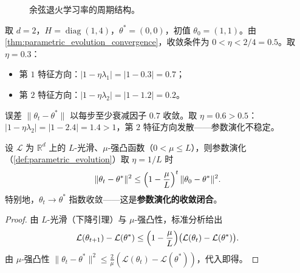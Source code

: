 \begin{figure}[htbp]
\centering
{}
\caption{余弦退火学习率的周期结构。}
\label{fig:cosine_annealing}
\end{figure}

\begin{example}[参数演化的数值验证]\label{ex:parametric_evolution_numeric}
取 $d=2$，$H = \operatorname{diag}(1,4)$，$\theta^* = (0,0)$，初值 $\theta_0 = (1,1)$。由 \cref{thm:parametric_evolution_convergence}，收敛条件为 $0 < \eta < 2/4 = 0.5$。取 $\eta = 0.3$：
\begin{itemize}
    \item 第 $1$ 特征方向：$|1-\eta\lambda_1| = |1-0.3| = 0.7$；
    \item 第 $2$ 特征方向：$|1-\eta\lambda_2| = |1-1.2| = 0.2$。
\end{itemize}
误差 $\|\theta_t - \theta^*\|$ 以每步至少衰减因子 $0.7$ 收敛。取 $\eta = 0.6 > 0.5$：$|1-\eta\lambda_2| = |1-2.4| = 1.4 > 1$，第 $2$ 特征方向发散——参数演化不稳定。
\end{example}

\begin{theorem}[参数演化的收敛闭合]\label{thm:parametric_evolution_closure}
设 $\mathcal{L}$ 为 $\mathbb{R}^d$ 上的 $L$-光滑、$\mu$-强凸函数（$0<\mu\le L$），则参数演化（\cref{def:parametric_evolution}）取 $\eta = 1/L$ 时
\[
\|\theta_t - \theta^*\|^2 \le \Bigl(1-\frac{\mu}{L}\Bigr)^t\,\|\theta_0-\theta^*\|^2.
\]
特别地，$\theta_t\to\theta^*$ 指数收敛——这是\textbf{参数演化的收敛闭合}。
\end{theorem}

\begin{proof}
由 $L$-光滑（下降引理）与 $\mu$-强凸性，标准分析给出
\[
\mathcal{L}(\theta_{t+1}) - \mathcal{L}(\theta^*) \le \Bigl(1-\frac{\mu}{L}\Bigr)\bigl(\mathcal{L}(\theta_t)-\mathcal{L}(\theta^*)\bigr).
\]
由 $\mu$-强凸性 $\|\theta_t-\theta^*\|^2\le\frac{2}{\mu}(\mathcal{L}(\theta_t)-\mathcal{L}(\theta^*))$，代入即得。
\end{proof}

